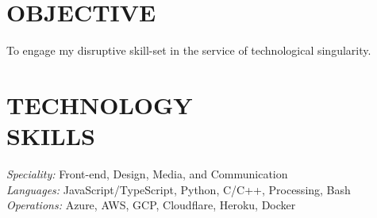 \documentclass[margin, 10pt]{res} %
\begin{document}
\begin{resume}

\section{OBJECTIVE}  
To engage my disruptive skill-set in the service of technological singularity.


\section{TECHNOLOGY \\ SKILLS} 

{\sl Speciality:} Front-end, Design, Media, and Communication \\
{\sl Languages:} JavaScript/TypeScript, Python, C/C++, Processing, Bash\\
{\sl Operations:} Azure, AWS, GCP, Cloudflare, Heroku, Docker



\end{resume}
\end{document}
